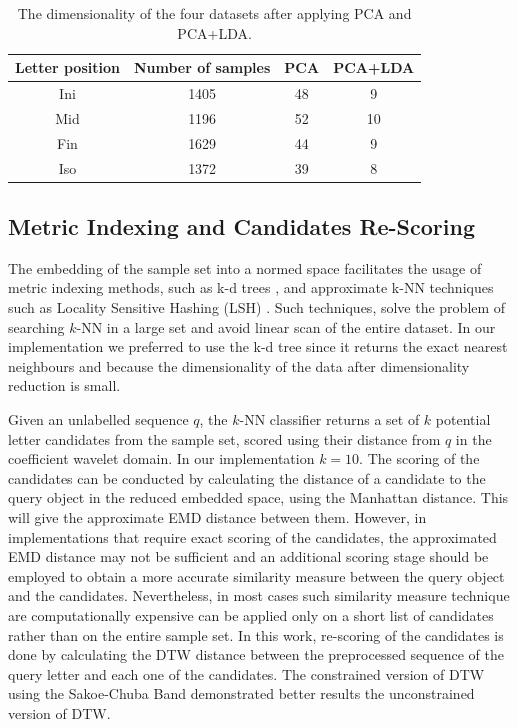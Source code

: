 \documentclass[10pt, conference, compsocconf]{IEEEtran}
\begin{document}
\begin{table}
\centering
\renewcommand{\arraystretch}{1.2}
\begin{tabular}{ | c | c | c | c |}
\hline
\textbf{Letter position} & \textbf{Number of samples} & \textbf{PCA} & \textbf{PCA+LDA}\\
\hline                 
  Ini & 1405 & 48 & 9 \\ 
  \hline
  Mid & 1196 & 52 & 10 \\ 
  \hline
  Fin & 1629 & 44 & 9 \\ 
  \hline
  Iso & 1372 & 39 & 8 \\ 
  \hline
\end{tabular}
\caption{The dimensionality of the four datasets after applying PCA and PCA+LDA.}
\label{table:dr_dimensions_results} 
\end{table}

\subsection{Metric Indexing and Candidates Re-Scoring}
\label{subsec:candidates_rescoring}
The embedding of the sample set into a normed space facilitates the usage of metric indexing methods, such as k-d trees \cite{bentley1975multidimensional}, and approximate k-NN techniques such as Locality Sensitive Hashing (LSH) \cite{gionis1999similarity}.
Such techniques, solve the problem of searching $k$-NN in a large set and avoid linear scan of the entire dataset.
In our implementation we preferred to use the k-d tree since it returns the exact nearest neighbours and because the dimensionality of the data after dimensionality reduction is small.

Given an unlabelled sequence $q$, the $k$-NN classifier returns a set of $k$ potential letter candidates from the sample set, scored using their distance from $q$ in the coefficient wavelet domain.
In our implementation $k=10$.
The scoring of the candidates can be conducted by calculating the distance of a candidate to the query object in the reduced embedded space, using the Manhattan distance.
This will give the approximate EMD distance between them. 
However, in implementations that require exact scoring of the candidates, the approximated EMD distance may not be sufficient and an additional scoring stage should be employed to obtain a more accurate similarity measure between the query object and the candidates.
Nevertheless, in most cases such similarity measure technique are computationally expensive can be applied only on a short list of candidates rather than on the entire sample set.
In this work, re-scoring of the candidates is done by calculating the DTW distance between the preprocessed sequence of the query letter and each one of the candidates.
The constrained version of DTW using the Sakoe-Chuba Band \cite{sakoe1978dynamic} demonstrated better results the unconstrained version of DTW.
\end{document}
